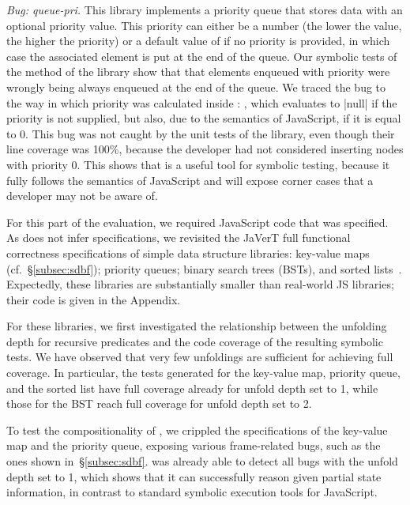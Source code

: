 \smallskip
\noindent \emph{Bug: queue-pri.} This library implements a priority queue that stores data with an optional priority value.
This priority can either be a number (the lower the value, the higher the priority) or a default value of  if no priority is provided, in which case the associated element is put at the end of the queue.
Our symbolic tests of the  method of the library show that that elements enqueued with priority  were wrongly being always enqueued at the end of the queue. We traced the bug to the way in which priority was calculated inside : , which evaluates to \jsinline|null| if the priority is not supplied, but also, due to the semantics of JavaScript, if it is equal to 0. This bug was not caught by the unit tests of the library, even though their line coverage was 100\%, because the developer had not considered inserting nodes with priority 0. This shows that \cosette is a useful tool for symbolic testing, because it fully follows the semantics of JavaScript and will expose corner cases that a developer may not be aware of.

 For this part of the evaluation, we required  JavaScript code that was specified. As \cosette does not infer specifications, we revisited the JaVerT full functional correctness specifications of simple data structure libraries: key-value maps (cf.~\S\ref{subsec:sdbf}); priority queues; binary search trees (BSTs), and sorted lists~\cite{javert}. Expectedly, these libraries are substantially smaller than real-world JS libraries; their code is given in the Appendix.

For these libraries, we first investigated the relationship between the unfolding depth for recursive predicates and the code coverage of the resulting symbolic tests. We have observed that very few unfoldings are sufficient for achieving full coverage. In particular, the tests generated for the key-value map, priority queue, and the sorted list have full coverage already for unfold depth set to 1, while those for the BST reach full coverage for unfold depth set to 2. 


To test the compositionality of \cosette, we crippled the specifications of the key-value map and the priority queue, exposing various frame-related bugs, such as the ones shown in~\S\ref{subsec:sdbf}. \cosette was already able to detect all bugs with the unfold depth set to 1, which shows that it can successfully reason given partial state information, in contrast to standard symbolic execution tools for JavaScript.
